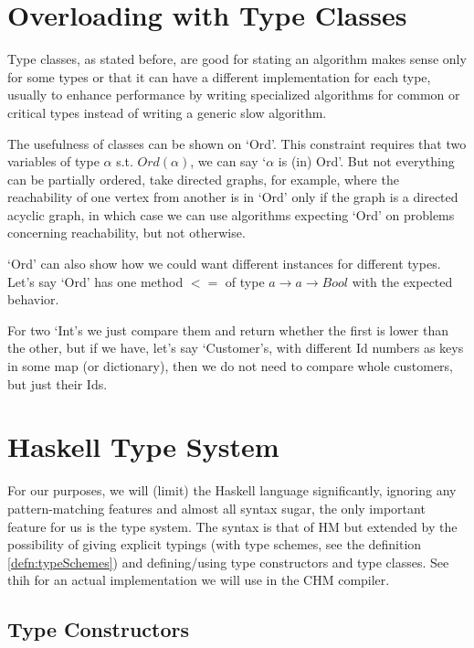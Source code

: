 \section{Overloading with Type Classes}

Type classes, as stated before, are good for stating an algorithm makes sense only for some types or that it can have a different implementation for each type, usually to enhance performance by writing specialized algorithms for common or critical types instead of writing a generic slow algorithm.

The usefulness of classes can be shown on `Ord'. This constraint requires that two variables of type $\alpha$ s.t. $Ord(\alpha)$, we can say `$\alpha$ is (in) Ord'. But not everything can be partially ordered, take directed graphs, for example, where the reachability of one vertex from another is in `Ord' only if the graph is a directed acyclic graph, in which case we can use algorithms expecting `Ord' on problems concerning reachability, but not otherwise.

`Ord' can also show how we could want different instances for different types. Let's say `Ord' has one method $<=$ of type $a \rightarrow a \rightarrow Bool$ with the expected behavior.

For two `Int's we just compare them and return whether the first is lower than the other, but if we have, let's say `Customer's, with different Id numbers as keys in some map (or dictionary), then we do not need to compare whole customers, but just their Ids.

\section{Haskell Type System}

For our purposes, we will (limit) the Haskell language significantly, ignoring any pattern-matching features and almost all syntax sugar, the only important feature for us is the type system. The syntax is that of HM but extended by the possibility of giving explicit typings (with type schemes, see the definition \ref{defn:typeSchemes}) and defining/using type constructors and type classes. See thih \cite{jones1999typing} for an actual implementation we will use in the CHM compiler.

\subsection{Type Constructors}

